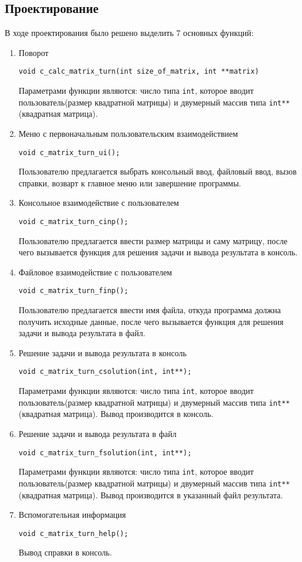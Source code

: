 \documentclass[12pt,a4paper]{report}
\begin{document}
\subsection{Проектирование}
\hspace{\parindent}В ходе проектирования было решено выделить 7 основных функций:
\begin{enumerate}
 	\item Поворот
 	
 	\verb+void c_calc_matrix_turn(int size_of_matrix, int **matrix)+
 	
	Параметрами функции являются: число типа \verb+int+, которое вводит пользователь(размер квадратной матрицы) и двумерный массив типа \verb+int**+(квадратная матрица).
		 
		 
	\item Меню с первоначальным пользовательским взаимодействием
	
	\verb+void c_matrix_turn_ui();+
	
	Пользователю предлагается выбрать консольный ввод, файловый ввод, вызов справки, возварт к главное меню или завершение программы. 	 
		 
	\item Консольное взаимодействие с пользователем
	
	\verb+void c_matrix_turn_cinp();+

	Пользователю предлагается ввести размер матрицы и саму матрицу, после чего вызывается функция для решения задачи и вывода результата в консоль.
	
	\item Файловое взаимодействие с пользователем
	
	\verb+void c_matrix_turn_finp();+

	Пользователю предлагается ввести имя файла, откуда программа должна получить исходные данные, после чего вызывается функция для решения задачи и вывода результата в файл.
	
	\item Решение задачи и вывода результата в консоль
	
	\verb+void c_matrix_turn_csolution(int, int**);+

	Параметрами функции являются: число типа \verb+int+, которое вводит пользователь(размер квадратной матрицы) и двумерный массив типа \verb+int**+(квадратная матрица). Вывод производится в консоль.
	
	\item Решение задачи и вывода результата в файл
	
	\verb+void c_matrix_turn_fsolution(int, int**);+

	Параметрами функции являются: число типа \verb+int+, которое вводит пользователь(размер квадратной матрицы) и двумерный массив типа \verb+int**+(квадратная матрица). Вывод производится в указанный файл результата.
	
	
	\item Вспомогательная информация
	
	\verb+void c_matrix_turn_help();+
	
	Вывод справки в консоль.
\end{enumerate}
\end{document}

